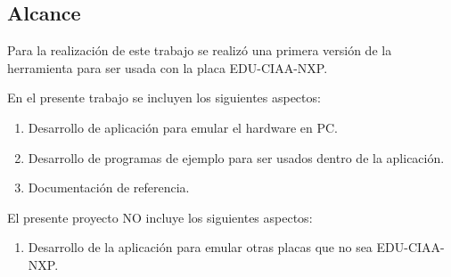 \subsection{Alcance}

Para la realización de este trabajo se realizó una primera versión de la herramienta para ser usada con la placa EDU-CIAA-NXP.

En el presente trabajo se incluyen los siguientes aspectos:

\begin{enumerate}
	\item Desarrollo de aplicación para emular el hardware en PC.
	\item Desarrollo de programas de ejemplo para ser usados dentro de la aplicación.
	\item Documentación de referencia.
\end{enumerate}

El presente proyecto NO incluye los siguientes aspectos:

\begin{enumerate}
	\item Desarrollo de la aplicación para emular otras placas que no sea EDU-CIAA-NXP.
\end{enumerate}